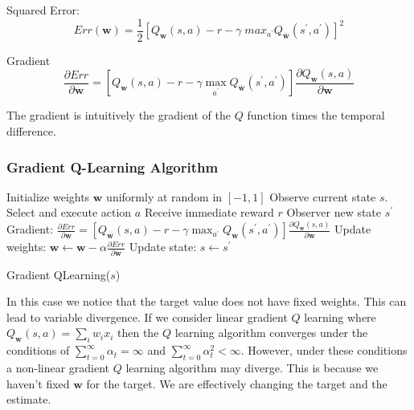 \documentclass[12pt]{article}
\begin{document}
        Squared Error:
        $$ Err(\boldsymbol{w}) = \frac{1}{2}[Q_{\boldsymbol{w}}(s,a) - r - \gamma \; max_{a^{\prime}}
        Q_{\boldsymbol{\bar{w}}}(s^{\prime}, a^{\prime})]^2 $$

        Gradient
        $$ \frac{\partial Err}{\partial \boldsymbol{w}}=\left[Q_{\boldsymbol{w}}(s, a)-r-\gamma \max _{a^{\prime}}
        Q_{\bar{\boldsymbol{w}}}\left(s^{\prime}, a^{\prime}\right)\right] \frac{\partial Q_{\boldsymbol{w}}(s,
        a)}{\partial \boldsymbol{w}} $$

        The gradient is intuitively the gradient of the $Q$ function times the temporal difference.

        \subsubsection{Gradient Q-Learning Algorithm}
            \begin{algorithm}[H] \label{GradientQLearningAlgo}
                \SetAlgoLined
                Initialize weights $\boldsymbol{w}$ uniformly at random in $[-1,1]$
                Observe current state $s$.
                 {
                    Select and execute action $a$ \;
                    Receive immediate reward $r$ \;
                    Observer new state $s^{\prime}$ \;
                    Gradient: $\frac{\partial Err}{\partial \boldsymbol{w}}=\left[Q_{\boldsymbol{w}}(s, a)-r-\gamma \max _{a^{\prime}}
                    Q_{\boldsymbol{w}}\left(s^{\prime}, a^{\prime}\right)\right] \frac{\partial Q_{\boldsymbol{w}}(s,
                    a)}{\partial \boldsymbol{w}}$ \;
                    Update weights: $\boldsymbol{w} \gets \boldsymbol{w} - \alpha \frac{\partial Err}{\partial
                    \boldsymbol{w}}$
                    Update state: $ s \gets s^{\prime} $
                }
                \caption{Gradient QLearning($s$)}
            \end{algorithm}
            

            In this case we notice that the target value does not have fixed weights. This can lead to variable
            divergence. If we consider linear gradient $Q$ learning where $Q_{\boldsymbol{w}}(s,a) = \sum_i w_i x_i$
            then the $Q$ learning algorithm converges under the conditions of $\sum_{t=0}^{\infty} \alpha_t = \infty$
            and $\sum_{t=0}^{\infty} \alpha_t^2 < \infty$. However, under these conditions a non-linear gradient $Q$
            learning algorithm may diverge. This is because we haven't fixed $\boldsymbol{w}$ for the target. We are
            effectively changing the target and the estimate.
        
\end{document}
